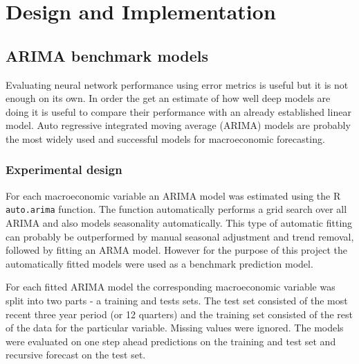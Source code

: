 \chapter{Design and Implementation}


\section{ARIMA benchmark models}
Evaluating neural network performance using error metrics is useful but it is not enough on its own. In order the get an estimate of how well deep models are doing it is useful to compare their performance with an already established linear model. Auto regressive integrated moving average (ARIMA) models are probably the most widely used and successful models for macroeconomic forecasting. 

\subsection{Experimental design}
For each macroeconomic variable an ARIMA model was estimated using the R \lstinline[language=R]{auto.arima} function. The function automatically performs a grid search over all ARIMA and also models seasonality automatically. This type of automatic fitting can probably be outperformed by manual seasonal adjustment and trend removal, followed by fitting an ARMA model. However for the purpose of this project the automatically fitted models were used as a benchmark prediction model.

For each fitted ARIMA model the corresponding macroeconomic variable was split into two parts - a training and tests sets. The test set consisted of the most recent three year period (or 12 quarters) and the training set consisted of the rest of the data for the particular variable. Missing values were ignored. The models were evaluated on one step ahead predictions on the training and test set and recursive forecast on the test set.